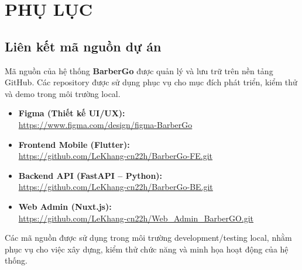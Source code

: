 \appendix
\chapter{PHỤ LỤC}
\section{Liên kết mã nguồn dự án}

Mã nguồn của hệ thống \textbf{BarberGo} được quản lý và lưu trữ trên nền tảng GitHub. 
Các repository được sử dụng phục vụ cho mục đích phát triển, kiểm thử và demo trong môi trường local.

\begin{itemize}

    \item \textbf{Figma (Thiết kế UI/UX):} \\
    \href{https://www.figma.com/design/pQuC7qgpw7Cj0vsetUxqrp/figma-BarberGo}{https://www.figma.com/design/figma-BarberGo}

    \item \textbf{Frontend Mobile (Flutter):} \\
    \url{https://github.com/LeKhang-cn22h/BarberGo-FE.git}

    \item \textbf{Backend API (FastAPI – Python):} \\
    \url{https://github.com/LeKhang-cn22h/BarberGo-BE.git}

    \item \textbf{Web Admin (Nuxt.js):} \\
    \url{https://github.com/LeKhang-cn22h/Web_Admin_BarberGO.git}
\end{itemize}

Các mã nguồn được sử dụng trong môi trường development/testing local, 
nhằm phục vụ cho việc xây dựng, kiểm thử chức năng và minh họa hoạt động của hệ thống.
